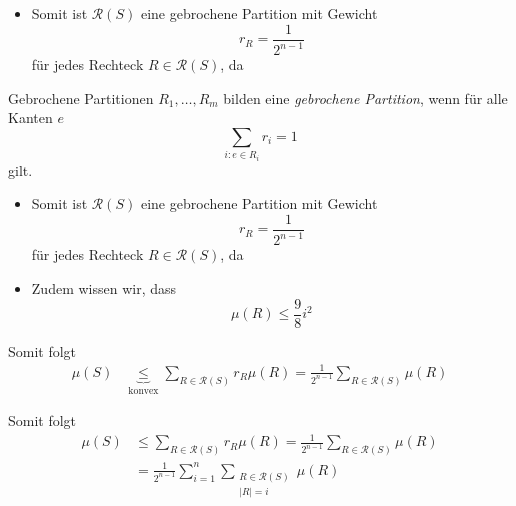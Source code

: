\begin{frame}[t]
    \begin{itemize}
        \item Somit ist $\mathcal{R}(S)$ eine gebrochene Partition mit Gewicht
        \[
             r_R = \frac{1}{2^{n-1}}
        \]
        f\"ur jedes Rechteck $R \in \mathcal{R}(S)$, da
    \end{itemize}
    \pause
    \begin{block}{Gebrochene Partitionen}
        $R_1,\dots,R_m$ bilden eine \textit{gebrochene Partition}, wenn f\"ur alle Kanten $e$
        \[
            \sum_{i : e \in R_i} r_i = 1
        \]
        gilt.
        \end{block}
\end{frame}

\begin{frame}[t,noframenumbering]
    \begin{itemize}
        \item Somit ist $\mathcal{R}(S)$ eine gebrochene Partition mit Gewicht
        \[
             r_R = \frac{1}{2^{n-1}}
        \]
        f\"ur jedes Rechteck $R \in \mathcal{R}(S)$, da
    \end{itemize}
    \begin{itemize}
        \item Zudem wissen wir, dass
        \[
            \mu(R) \leq \frac{9}{8} i^2
        \]
    \end{itemize}
\end{frame}

\begin{frame}[t]{}
    Somit folgt
    \begin{align*}
        \mu(S) &\underbrace{\leq}_{\text{konvex}} \sum_{R \in \mathcal{R}(S)} r_R \mu(R) = \frac{1}{2^{n-1}} \sum_{R \in \mathcal{R}(S)} \mu(R)
    \end{align*}
\end{frame}

\begin{frame}[t, noframenumbering]{}
    Somit folgt
    \begin{align*}
        \mu(S) &\leq \sum_{R \in \mathcal{R}(S)} r_R \mu(R)= \frac{1}{2^{n-1}} \sum_{R \in \mathcal{R}(S)} \mu(R)\\
        &= \frac{1}{2^{n-1}} \sum_{i=1}^n \sum_{\substack{R \in \mathcal{R}(S)\\|R| = i}} \mu(R)
    \end{align*}
\end{frame}

